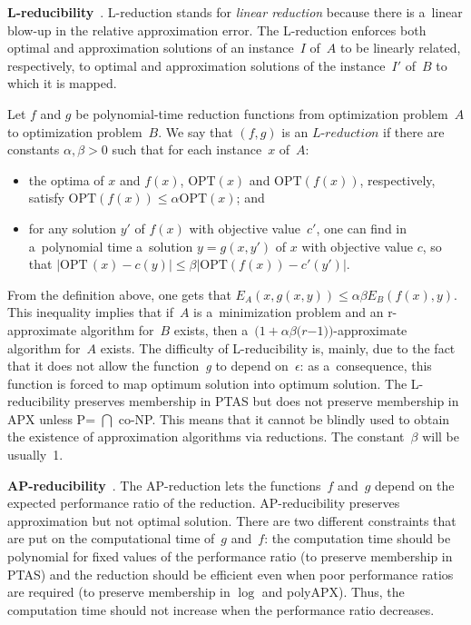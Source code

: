 \begin{multicols}{2}
\smallskip

\noindent
\textbf{L-reducibility}~\cite{TrevisanLuca}. L-reduction
stands for \textit{linear reduction} because there is a~linear
blow-up in the relative approximation error. The L-reduction
enforces both optimal and approximation solutions of an instance~$I$
of~$A$ to be linearly related, respectively, to optimal and
approximation solutions of the instance~$I'$ of~$B$ to which it is
mapped.

Let $f$ and $g$ be polynomial-time reduction functions from
optimization problem~$A$ to optimization problem~$B$. We say that
$(f,g)$ is an $\textit{L-reduction}$ if there are constants
$\alpha,\beta > 0$ such that for each instance~$x$ of~$A$:
\begin{itemize}
\item the optima of $x$ and $f(x)$, $\mathrm{OPT}\left(x\right)$ and
$\mathrm{OPT}\left(f(x)\right)$, respectively,
satisfy $\mathrm{OPT}\left(f(x)\right) \leq \alpha \mathrm{OPT}\left(x\right)$; and
\item for any solution $y'$ of $f(x)$ with objective value~$c'$,
one can find in a~polynomial time a~solution $y = g(x,y')$ of $x$
with objective value $c$, so that $|\mathrm{OPT}\,(x)-c(y)| \leq
\beta |\mathrm{OPT}\left(f(x)\right)-c'(y')|$.
\end{itemize}

From the definition above, one gets that $E_A(x,g(x,y))\leq \alpha\beta
E_B(f(x),y)$. This inequality implies that if~$A$ is a~minimization
problem and an \mbox{r-approximate} algorithm for~$B$ exists, then
a~$(1+\alpha\beta (r$\linebreak $-1))$-approximate algorithm for~$A$ exists. The
difficulty of L-reducibility is, mainly, due to the fact that it does
not allow the function~\textit{g} to depend on~$\epsilon$: as a~consequence, this function is forced to map optimum solution into
optimum solution. The L-reducibility preserves membership in
PTAS but does not preserve membership in {APX} unless {P}\;= $\bigcap$ co-{NP}. This means that it cannot be
blindly used to obtain the existence of approximation algorithms via
reductions. The constant~$\beta$ will be usually~1.

\smallskip

\noindent
\textbf{AP-reducibility}~\cite{TrevisanLuca}. The
AP-reduction lets the functions~$f$ and~$g$ depend on the expected
performance ratio of the reduction. AP-reducibility preserves
approximation but not optimal solution. There are two different
constraints that are put on the computational time of~$g$ and~$f$:
the computation time should be polynomial for fixed values of the
performance ratio (to preserve membership in PTAS) and the
reduction should be efficient even when poor performance ratios are
required (to preserve membership in $\log$ and poly{APX}).
Thus, the computation time should not increase when the performance
ratio decreases.


\end{multicols}
